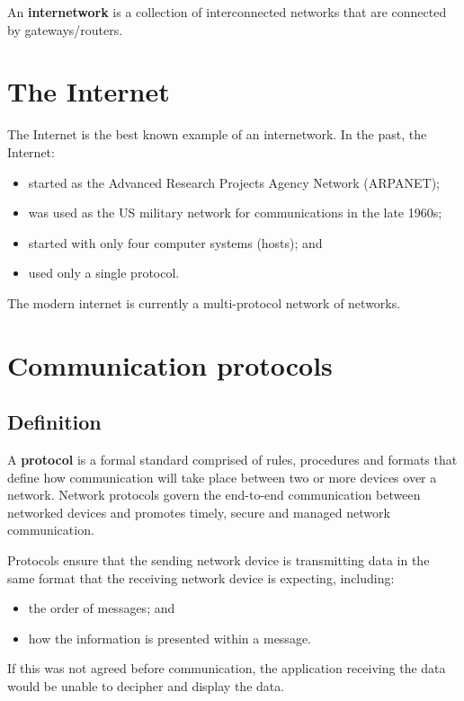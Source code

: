 \documentclass[a4paper]{systems-software}
\begin{document}
An \textbf{internetwork} is a collection of interconnected networks that are connected by gateways/routers.


\section*{The Internet}

The Internet is the best known example of an internetwork. In the past, the Internet:
\begin{itemize}
	\item started as the Advanced Research Projects Agency Network (ARPANET);
	\item was used as the US military network for communications in the late 1960s;
	\item started with only four computer systems (hosts); and
	\item used only a single protocol.
\end{itemize}

The modern internet is currently a multi-protocol network of networks.


\section*{Communication protocols}

\subsection*{Definition}

A \textbf{protocol} is a formal standard comprised of rules, procedures and formats that define how communication will take place between two or more devices over a network. Network protocols govern the end-to-end communication between networked devices and promotes timely, secure and managed network communication.

Protocols ensure that the sending network device is transmitting data in the same format that the receiving network device is expecting, including:
\begin{itemize}
	\item the order of messages; and
	\item how the information is presented within a message.
\end{itemize}

If this was not agreed before communication, the application receiving the data would be unable to decipher and display the data.
\end{document}
